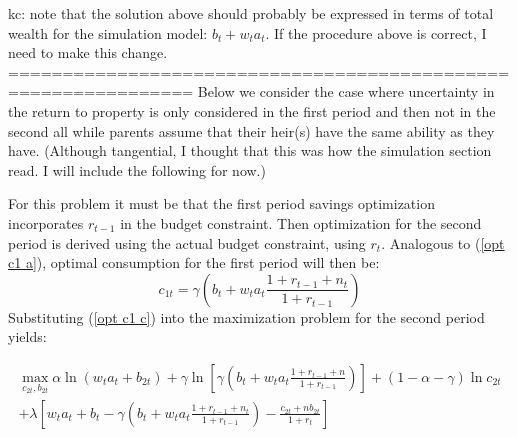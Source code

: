 \documentclass{article}
\begin{document}
kc: note that the solution above should probably be expressed in terms of total wealth for the simulation model: $b_t+w_t a_t$.  If the procedure above is correct, I need to make this change.\newline
===============================================================
Below we consider the case where uncertainty in the return to property is only considered in the first period and then not in the second all while parents assume that their heir(s) have the same ability as they have. (Although tangential, I thought that this was how the simulation section read.  I will include the following for now.)

For this problem it must be that the first period savings optimization incorporates $r_{t-1}$ in the budget constraint.  Then optimization for the second period is derived using the actual budget constraint, using $r_t$.  Analogous to (\ref{opt c1 a}), optimal consumption for the first period will then be:
\begin{equation}\label{opt c1 c2}
c_{1t} = \gamma(b_t + w_t a_t\frac{1+r_{t-1}+n_t}{1+r_{t-1}} )
\end{equation}
Substituting (\ref{opt c1 c}) into the maximization problem for the second period yields:

\begin{equation}
\begin{split}
\max_{c_{2t}, b_{2t}} \alpha \ln (w_t a_{t} + b_{2t})
+ \gamma \ln [ \gamma(b_t+w_t a_{t} \frac{1+r_{t-1}+n}{1+r_{t-1}}) ]
+ (1-\alpha-\gamma) \ln c_{2t}\\
+ \lambda [ w_t a_t + b_t - \gamma(b_t +w_t a_t \frac{1+r_{t-1}+n_t}{1+r_{t-1}} ) - \frac{c_{2t} + n b_{2t}}{1+r_t}]
\end{split}
\end{equation}
\end{document}
